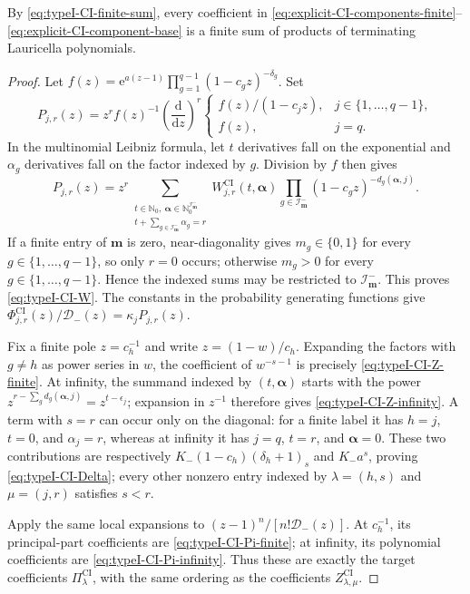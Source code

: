 \documentclass[10pt]{amsart}
\newcommand{\Nzero}{\mathbb N_0}
\theoremstyle{plain}
\theoremstyle{definition}
\theoremstyle{remark}
\begin{document}
By \eqref{eq:typeI-CI-finite-sum}, every coefficient in
\eqref{eq:explicit-CI-components-finite}--
\eqref{eq:explicit-CI-component-base} is a finite sum of products of
terminating Lauricella polynomials.

\begin{proof}
Let \(f(z)=\mathrm e^{a(z-1)}
\prod_{g=1}^{q-1}(1-c_gz)^{-\delta_g}\).
Set
\[
 P_{j,r}(z)=z^rf(z)^{-1}
 \left(\frac{\mathrm d}{\mathrm dz}\right)^r
 \begin{cases}
  f(z)/(1-c_jz),&j\in\{1,\ldots,q-1\},\\
  f(z),&j=q.
 \end{cases}
\]
In the multinomial Leibniz formula, let \(t\) derivatives fall on the
exponential and \(\alpha_g\) derivatives fall on the factor indexed by
\(g\).  Division by \(f\) then gives
\[
 P_{j,r}(z)=z^r
 \sum_{\substack{t\in\Nzero,\ 
                  \boldsymbol\alpha\in\mathbb N_0^{\mathcal I_{\boldsymbol m}^-}\\
                  t+\sum_{g\in\mathcal I_{\boldsymbol m}^-}\alpha_g=r}}
 W_{j,r}^{\mathrm{CI}}(t,\boldsymbol\alpha)
 \prod_{g\in\mathcal I_{\boldsymbol m}^-}
 (1-c_gz)^{-d_g(\boldsymbol\alpha,j)}.
\]
If a finite entry of \(\boldsymbol m\) is zero, near-diagonality gives
\(m_g\in\{0,1\}\) for every \(g\in\{1,\ldots,q-1\}\), so only \(r=0\)
occurs; otherwise \(m_g>0\) for every
\(g\in\{1,\ldots,q-1\}\). Hence the indexed sums
may be restricted to \(\mathcal I_{\boldsymbol m}^-\).  This proves
\eqref{eq:typeI-CI-W}. The constants in the probability generating
functions give
\(\Phi_{j,r}^{\mathrm{CI}}(z)/\mathcal D_-(z)
=\kappa_jP_{j,r}(z)\).

Fix a finite pole \(z=c_h^{-1}\) and write \(z=(1-w)/c_h\).  Expanding
the factors with \(g\ne h\) as power series in \(w\), the coefficient of
\(w^{-s-1}\) is precisely \eqref{eq:typeI-CI-Z-finite}. At infinity, the
summand indexed by \((t,\boldsymbol\alpha)\) starts with the power
\(z^{r-\sum_g d_g(\boldsymbol\alpha,j)}=z^{t-\epsilon_j}\); expansion in \(z^{-1}\)
therefore gives
\eqref{eq:typeI-CI-Z-infinity}. A term with \(s=r\) can occur only
on the diagonal: for a finite label it has \(h=j\), \(t=0\), and
\(\alpha_j=r\), whereas at infinity it has \(j=q\), \(t=r\), and
\(\boldsymbol\alpha=0\).  These two contributions are respectively
\(K_-(1-c_h)(\delta_h+1)_s\) and \(K_-a^s\), proving
\eqref{eq:typeI-CI-Delta}; every other nonzero entry indexed by
\(\lambda=(h,s)\) and \(\mu=(j,r)\) satisfies \(s<r\).

Apply the same local expansions to
\((z-1)^n/[n!\mathcal D_-(z)]\).  At \(c_h^{-1}\), its principal-part
coefficients are \eqref{eq:typeI-CI-Pi-finite}; at infinity, its
polynomial coefficients are \eqref{eq:typeI-CI-Pi-infinity}.  Thus these
are exactly the target coefficients \(\Pi_\lambda^{\mathrm{CI}}\), with the
same ordering as the coefficients \(Z_{\lambda,\mu}^{\mathrm{CI}}\).


\end{proof}
\end{document}

